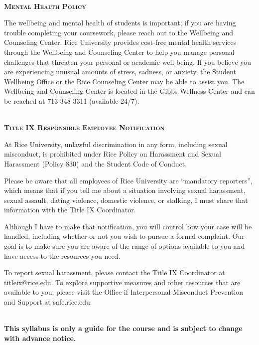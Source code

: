 \documentclass[11pt]{article}
\begin{document}
~\\
\textbf{\textsc{Mental Health Policy}}
\begin{adjustwidth}{1cm}{0cm}
	The wellbeing and mental health of students is important; if you are having trouble completing your coursework, please reach out to the Wellbeing and Counseling Center. Rice University provides cost-free mental health services through the Wellbeing and Counseling Center to help you manage personal challenges that threaten your personal or academic well-being. If you believe you are experiencing unusual amounts of stress, sadness, or anxiety, the Student Wellbeing Office or the Rice Counseling Center may be able to assist you. The Wellbeing and Counseling Center is located in the Gibbs Wellness Center and can be reached at 713-348-3311 (available 24/7).
\end{adjustwidth}

~\\
\textbf{\textsc{Title IX Responsible Employee Notification}}
\begin{adjustwidth}{1cm}{0cm}
  At Rice University, unlawful discrimination in any form, including sexual misconduct, is prohibited under Rice Policy on Harassment and Sexual Harassment (Policy 830) and the Student Code of Conduct.

  Please be aware that all employees of Rice University are ``mandatory reporters'', which means that if you tell me about a situation involving sexual harassment, sexual assault, dating violence, domestic violence, or stalking, I must share that information with the Title IX Coordinator.

  Although I have to make that notification, you will control how your case will be handled, including whether or not you wish to pursue a formal complaint. Our goal is to make sure you are aware of the range of options available to you and have access to the resources you need.

  To report sexual harassment, please contact the Title IX Coordinator at titleix@rice.edu. To explore supportive measures and other resources that are available to you, please visit the Office if Interpersonal Misconduct Prevention and Support at safe.rice.edu.
\end{adjustwidth}

~\\
\textbf{This syllabus is only a guide for the course and is subject to change with advance notice.}
\end{document}
